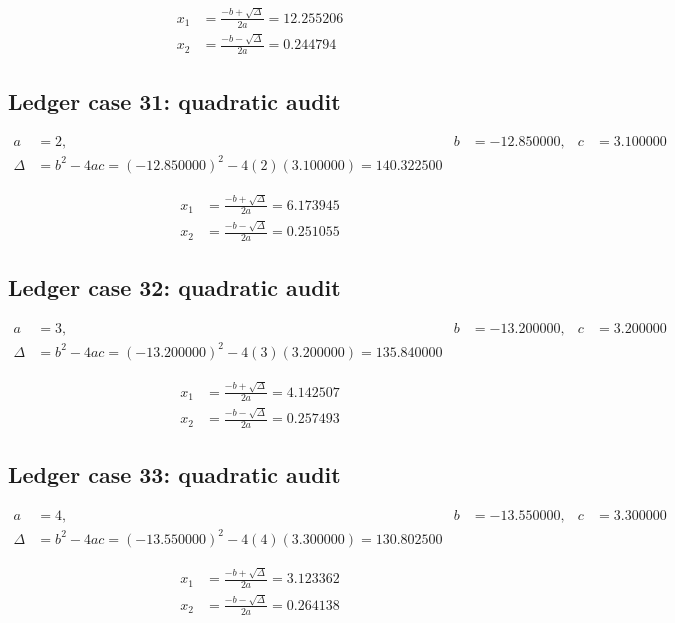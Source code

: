 \documentclass[11pt,a4paper]{article}
\begin{document}
\begin{align}
x_1 &= \frac{-b+\sqrt{\Delta}}{2a} = 12.255206 \\
x_2 &= \frac{-b-\sqrt{\Delta}}{2a} = 0.244794
\end{align}

\newpage

\subsection{Ledger case 31: quadratic audit}
\begin{align}
a &= 2, & b &= -12.850000, & c &= 3.100000 \\
\Delta &= b^2-4ac = (-12.850000)^2 - 4(2)(3.100000) = 140.322500
\end{align}

\begin{align}
x_1 &= \frac{-b+\sqrt{\Delta}}{2a} = 6.173945 \\
x_2 &= \frac{-b-\sqrt{\Delta}}{2a} = 0.251055
\end{align}

\subsection{Ledger case 32: quadratic audit}
\begin{align}
a &= 3, & b &= -13.200000, & c &= 3.200000 \\
\Delta &= b^2-4ac = (-13.200000)^2 - 4(3)(3.200000) = 135.840000
\end{align}

\begin{align}
x_1 &= \frac{-b+\sqrt{\Delta}}{2a} = 4.142507 \\
x_2 &= \frac{-b-\sqrt{\Delta}}{2a} = 0.257493
\end{align}

\subsection{Ledger case 33: quadratic audit}
\begin{align}
a &= 4, & b &= -13.550000, & c &= 3.300000 \\
\Delta &= b^2-4ac = (-13.550000)^2 - 4(4)(3.300000) = 130.802500
\end{align}

\begin{align}
x_1 &= \frac{-b+\sqrt{\Delta}}{2a} = 3.123362 \\
x_2 &= \frac{-b-\sqrt{\Delta}}{2a} = 0.264138
\end{align}
\end{document}
